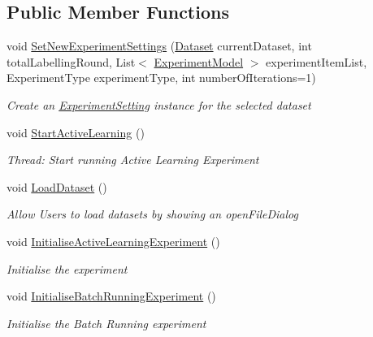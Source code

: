 \subsection*{Public Member Functions}
\begin{DoxyCompactItemize}
\item 
void \hyperlink{class_acrive_crowd_g_u_i_1_1_main_page_a3f378984fd0ad436a017dbf83c825caa}{Set\+New\+Experiment\+Settings} (\hyperlink{class_acrive_crowd_g_u_i_1_1_dataset}{Dataset} current\+Dataset, int total\+Labelling\+Round, List$<$ \hyperlink{class_acrive_crowd_g_u_i_1_1_experiment_model}{Experiment\+Model} $>$ experiment\+Item\+List, Experiment\+Type experiment\+Type, int number\+Of\+Iterations=1)
\begin{DoxyCompactList}\small\item\em Create an \hyperlink{class_acrive_crowd_g_u_i_1_1_experiment_setting}{Experiment\+Setting} instance for the selected dataset \end{DoxyCompactList}\item 
void \hyperlink{class_acrive_crowd_g_u_i_1_1_main_page_aee868a0bb7d6d3cca0b4c95d18808f6d}{Start\+Active\+Learning} ()
\begin{DoxyCompactList}\small\item\em Thread\+: Start running Active Learning Experiment \end{DoxyCompactList}\item 
void \hyperlink{class_acrive_crowd_g_u_i_1_1_main_page_acdc6fce960c26ddbb3e91ebb200cd8fe}{Load\+Dataset} ()
\begin{DoxyCompactList}\small\item\em Allow Users to load datasets by showing an open\+File\+Dialog \end{DoxyCompactList}\item 
void \hyperlink{class_acrive_crowd_g_u_i_1_1_main_page_a889698b28686f0c5e3ee36ba14c54313}{Initialise\+Active\+Learning\+Experiment} ()
\begin{DoxyCompactList}\small\item\em Initialise the experiment \end{DoxyCompactList}\item 
void \hyperlink{class_acrive_crowd_g_u_i_1_1_main_page_aae0912d35902e7dbe2a42146cadefd8f}{Initialise\+Batch\+Running\+Experiment} ()
\begin{DoxyCompactList}\small\item\em Initialise the Batch Running experiment \end{DoxyCompactList}\item 

\end{DoxyCompactItemize}
